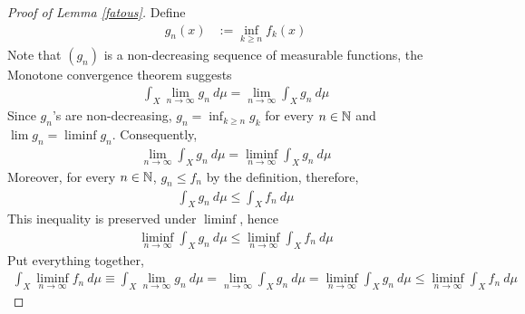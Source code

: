 \documentclass[11pt]{article}
\begin{document}
	\begin{proof}[Proof of Lemma \ref{fatous}]
	    Define
	    \begin{align}
	        g_n(x) &:= \inf_{k \geq n} f_k(x)
	    \end{align}
	    Note that $(g_n)$ is a non-decreasing sequence of measurable functions, the Monotone convergence theorem suggests
	    \begin{align}
	        \int_X \lim_{n \to \infty} g_n\ d\mu
	        = \lim_{n\to\infty} \int_X g_n\ d\mu
	    \end{align}
	    Since $g_n$'s are non-decreasing, $g_n = \inf_{k \geq n} g_k$ for every $n \in \mathbb{N}$ and $\lim g_n = \liminf g_n$.
	    Consequently,
	    \begin{align}
	        \lim_{n\to\infty}\int_X g_n\ d\mu = \liminf_{n\to\infty}\int_X g_n\ d\mu
	    \end{align}
	    Moreover, for every $n \in \mathbb{N}$, $g_n \leq f_n$ by the definition, therefore,
	    \begin{align}
	        \int_X g_n\ d\mu \leq \int_X f_n\ d\mu
	    \end{align}
	    This inequality is preserved under $\liminf$, hence
	    \begin{align}
	        \liminf_{n\to\infty}\int_X g_n\ d\mu \leq \liminf_{n\to\infty}\int_X f_n\ d\mu
	    \end{align}
	    Put everything together, 
	    \begin{align}
	        \int_X \liminf_{n \to \infty}f_n\ d\mu
	        \equiv\int_X \lim_{n \to \infty} g_n\ d\mu
	        = \lim_{n\to\infty} \int_X g_n\ d\mu
	        = \liminf_{n\to\infty}\int_X g_n\ d\mu
	        \leq \liminf_{n\to\infty}\int_X f_n\ d\mu
	    \end{align}
	\end{proof}
\end{document}
